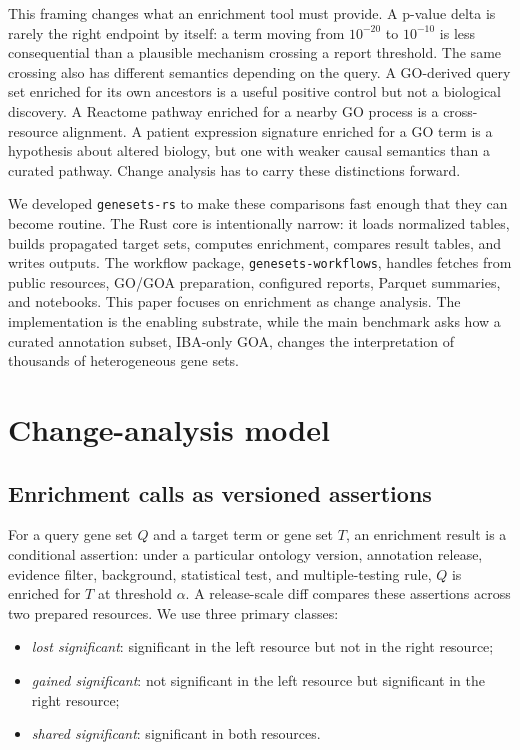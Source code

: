 \documentclass[11pt]{article}
\newcommand{\tool}{\texttt{genesets-rs}}
\newcommand{\workflow}{\texttt{genesets-workflows}}
\begin{document}
This framing changes what an enrichment tool must provide. A p-value delta is rarely the right endpoint by itself: a term moving from $10^{-20}$ to $10^{-10}$ is less consequential than a plausible mechanism crossing a report threshold. The same crossing also has different semantics depending on the query. A GO-derived query set enriched for its own ancestors is a useful positive control but not a biological discovery. A Reactome pathway enriched for a nearby GO process is a cross-resource alignment. A patient expression signature enriched for a GO term is a hypothesis about altered biology, but one with weaker causal semantics than a curated pathway. Change analysis has to carry these distinctions forward.

We developed \tool{} to make these comparisons fast enough that they can become routine. The Rust core is intentionally narrow: it loads normalized tables, builds propagated target sets, computes enrichment, compares result tables, and writes outputs. The workflow package, \workflow{}, handles fetches from public resources, GO/GOA preparation, configured reports, Parquet summaries, and notebooks. This paper focuses on enrichment as change analysis. The implementation is the enabling substrate, while the main benchmark asks how a curated annotation subset, IBA-only GOA, changes the interpretation of thousands of heterogeneous gene sets.

\section{Change-analysis model}

\subsection{Enrichment calls as versioned assertions}

For a query gene set $Q$ and a target term or gene set $T$, an enrichment result is a conditional assertion: under a particular ontology version, annotation release, evidence filter, background, statistical test, and multiple-testing rule, $Q$ is enriched for $T$ at threshold $\alpha$. A release-scale diff compares these assertions across two prepared resources. We use three primary classes:

\begin{itemize}
\item \emph{lost significant}: significant in the left resource but not in the right resource;
\item \emph{gained significant}: not significant in the left resource but significant in the right resource;
\item \emph{shared significant}: significant in both resources.
\end{itemize}
\end{document}
